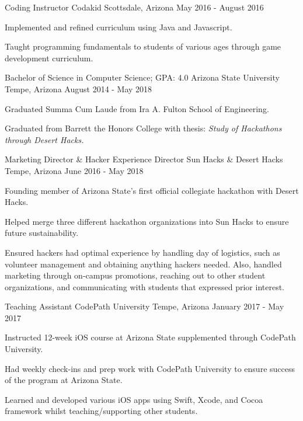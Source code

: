 \documentclass[
    changecolor={96, 52, 177},
]{peter-resume}
\begin{document}
\cventry
  {Coding Instructor}
  {Codakid}
  {Scottsdale, Arizona}
  {May 2016 - August 2016}
  {
    \begin{cvitems}
      \item {Implemented and refined curriculum using Java and Javascript.}
      \item {Taught programming fundamentals to students of various ages through game development curriculum.}
    \end{cvitems}
  }

\cventry
  {Bachelor of Science in Computer Science; GPA: 4.0}
  {Arizona State University}
  {Tempe, Arizona}
  {August 2014 - May 2018}
  {
    \begin{cvitems}
      \item {Graduated Summa Cum Laude from Ira A. Fulton School of Engineering.}
      \item {Graduated from Barrett the Honors College with thesis: \it{Study of Hackathons through Desert Hacks}.}
    \end{cvitems}
  }

\cventry
  {Marketing Director \& Hacker Experience Director}
  {Sun Hacks \& Desert Hacks}
  {Tempe, Arizona}
  {June 2016 - May 2018}
  {
    \begin{cvitems}
      \item {Founding member of Arizona State's first official collegiate hackathon with Desert Hacks.}
      \item {Helped merge three different hackathon organizations into Sun Hacks to ensure future sustainability.}
      \item {Ensured hackers had optimal experience by handling day of logistics, such as volunteer management and obtaining anything hackers needed. Also, handled marketing through on-campus promotions, reaching out to other student organizations, and communicating with students that expressed prior interest.}
    \end{cvitems}
  }
\cventry
  {Teaching Assistant}
  {CodePath University}
  {Tempe, Arizona}
  {January 2017 - May 2017}
  {
    \begin{cvitems}
      \item {Instructed 12-week iOS course at Arizona State supplemented through CodePath University.}
      \item {Had weekly check-ins and prep work with CodePath University to ensure success of the program at Arizona State.}
      \item {Learned and developed various iOS apps using Swift, Xcode, and Cocoa framework whilst teaching/supporting other students.}
    \end{cvitems}
  }

  \begin{cvskills}
  \end{cvskills}
\end{document}

